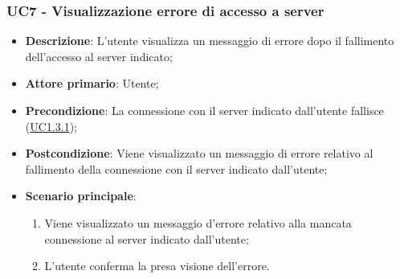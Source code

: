 \subsubsection{UC7 - Visualizzazione errore di accesso a server}
\label{sub:uc7}
\begin{itemize}
    \item \textbf{Descrizione}: L'utente visualizza un messaggio di errore dopo il fallimento dell'accesso
    al server indicato;

    \item \textbf{Attore primario}: Utente;
    
    \item \textbf{Precondizione}:   La connessione con il server indicato dall'utente fallisce 
    (\hyperref[par:uc1.3.1]{UC1.3.1});

    \item \textbf{Postcondizione}:  Viene visualizzato un messaggio di errore relativo al fallimento della connessione 
    con il server indicato dall'utente;

    \item \textbf{Scenario principale}:
    \begin{enumerate}
        \item Viene visualizzato un messaggio d'errore relativo alla mancata connessione al server indicato dall'utente;
        \item L'utente conferma la presa visione dell'errore.
    \end{enumerate}
\end{itemize}




